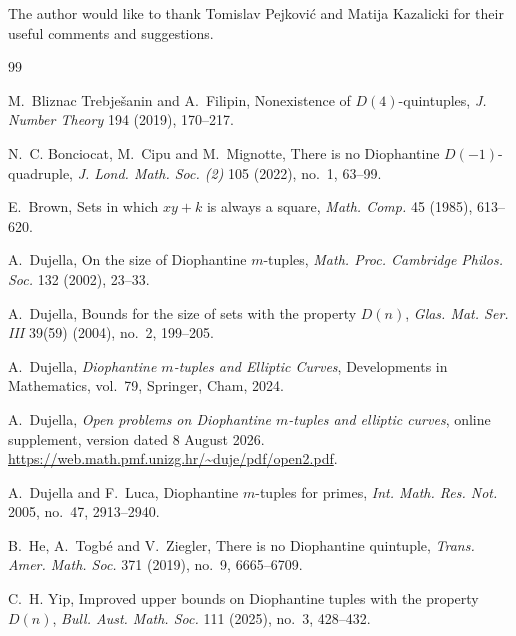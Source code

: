 \documentclass[11pt]{amsart}
\theoremstyle{remark}
\begin{document}
The author would like to thank Tomislav Pejkovi\' c and Matija Kazalicki for their useful comments and suggestions.


\begin{thebibliography}{99}

M.~Bliznac Trebje\v{s}anin and A.~Filipin, 
Nonexistence of $D(4)$-quintuples, 
\emph{J. Number Theory} 194 (2019), 170--217.

N.~C. Bonciocat, M.~Cipu and M.~Mignotte,
There is no Diophantine $D(-1)$-quadruple,
\emph{J. Lond. Math. Soc. (2)} 105 (2022), no.~1, 63--99.

E.~Brown, 
Sets in which $xy + k$ is always a square, 
\emph{Math. Comp.} 45 (1985), 613--620.

A.~Dujella,
On the size of Diophantine $m$-tuples,
\emph{Math. Proc. Cambridge Philos. Soc.} 132 (2002), 23--33.

A.~Dujella,
Bounds for the size of sets with the property $D(n)$,
\emph{Glas. Mat. Ser. III} 39(59) (2004), no.~2, 199--205.

A.~Dujella,
\emph{Diophantine $m$-tuples and Elliptic Curves},
Developments in Mathematics, vol.~79, Springer, Cham, 2024.

A.~Dujella,
\emph{Open problems on Diophantine $m$-tuples and elliptic curves},
online supplement, version dated 8 August 2026.
\url{https://web.math.pmf.unizg.hr/~duje/pdf/open2.pdf}.

A.~Dujella and F.~Luca,
Diophantine $m$-tuples for primes,
\emph{Int. Math. Res. Not.} 2005, no.~47, 2913--2940.

B.~He, A.~Togb\'e and V.~Ziegler,
There is no Diophantine quintuple,
\emph{Trans. Amer. Math. Soc.} 371 (2019), no.~9, 6665--6709.

C.~H. Yip,
Improved upper bounds on Diophantine tuples with the property $D(n)$,
\emph{Bull. Aust. Math. Soc.} 111 (2025), no.~3, 428--432.

\end{thebibliography}
\end{document}
